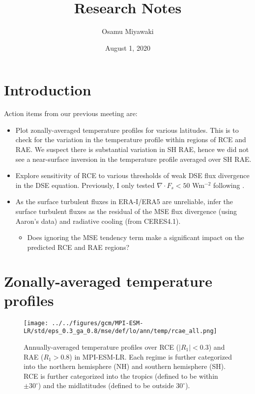 \documentclass[11pt]{article}
\author{Osamu Miyawaki}
\date{August 1, 2020}
\title{Research Notes}
\begin{document}
\maketitle

\section{Introduction}
\label{sec:orgc63b1bb}
Action items from our previous meeting are:
\begin{itemize}
\item Plot zonally-averaged temperature profiles for various latitudes. This is to check for the variation in the temperature profile within regions of RCE and RAE. We suspect there is substantial variation in SH RAE, hence we did not see a near-surface inversion in the temperature profile averaged over SH RAE.
\item Explore sensitivity of RCE to various thresholds of weak DSE flux divergence in the DSE equation. Previously, I only tested \(\nabla\cdot F_s<50\) Wm\(^{-2}\) following \cite{jakob2019}.
\item As the surface turbulent fluxes in ERA-I/ERA5 are unreliable, infer the surface turbulent fluxes as the residual of the MSE flux divergence (using Aaron's data) and radiative cooling (from CERES4.1).
\begin{itemize}
\item Does ignoring the MSE tendency term make a significant impact on the predicted RCE and RAE regions?
\end{itemize}
\end{itemize}

\section{Zonally-averaged temperature profiles}
\label{sec:org0ace24e}

\begin{figure}[htbp]
\centering
\texttt{[image: ../../figures/gcm/MPI-ESM-LR/std/eps\_0.3\_ga\_0.8/mse/def/lo/ann/temp/rcae\_all.png]}
\caption{\label{fig:org1617712}Annually-averaged temperature profiles over RCE (\(|R_1|<0.3\)) and RAE (\(R_1>0.8\)) in MPI-ESM-LR. Each regime is further categorized into the northern hemisphere (NH) and southern hemisphere (SH). RCE is further categorized into the tropics (defined to be within \(\pm 30^\circ\)) and the midlatitudes (defined to be outside \(30^\circ\)).}
\end{figure}
\end{document}
